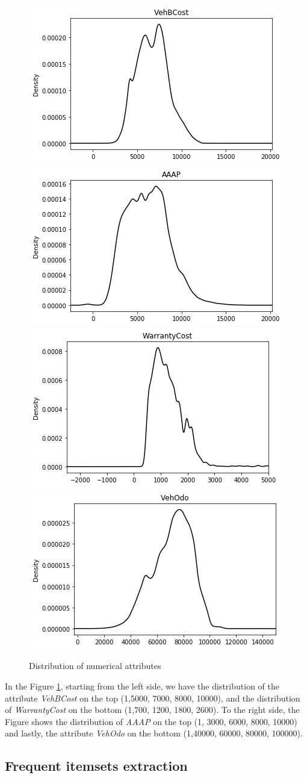 \documentclass{article}
\begin{document}
	\begin{figure}[H]
		\centering
		\includegraphics[width=.4\textwidth]{vehbcost}\hspace{1cm}
		\includegraphics[width=.4\textwidth]{AAAP}
		\includegraphics[width=.4\textwidth]{warrantycost}\hspace{1cm}
		\includegraphics[width=.4\textwidth]{vehodo}
		\caption{Distribution of numerical attributes}
		\label{fig:hyper_rf}
	\end{figure}
	
	In the Figure \ref{fig:hyper_rf}, starting from the left side, we have the distribution of the attribute \emph{VehBCost} on the top (1,5000, 7000, 8000, 10000), and the distribution of \emph{WarrantyCost} on the bottom (1,700, 1200, 1800, 2600). 
	To the right side, the Figure shows the distribution of \emph{AAAP} on the top (1, 3000, 6000, 8000, 10000) and lastly, the attribute \emph{VehOdo} on the bottom (1,40000, 60000, 80000, 100000). 
	
	\subsection{Frequent itemsets extraction}
	
\end{document}
